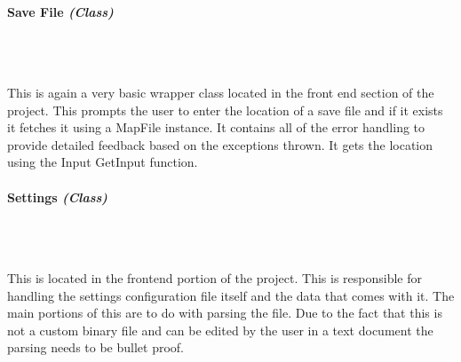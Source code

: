 \begin{FlushLeft}
    
    \pagebreak
\paragraph{Save File \textit{(Class)}} \mbox{} \\

    \begin{figure}[H]
        \centering
    \end{figure}\\

    This is again a very basic wrapper class located in the front end section of the project. This prompts the user to enter the location of a save file and if it exists it fetches it using a MapFile instance. It contains all of the error handling to provide detailed feedback based on the exceptions thrown. It gets the location using the Input GetInput function.\\

    \bk

    
    \pagebreak
\paragraph{Settings \textit{(Class)}} \mbox{} \\

    \begin{figure}[H]
        \centering
    \end{figure}\\
    This is located in the frontend portion of the project. This is responsible for handling the settings configuration file itself and the data that comes with it. The main portions of this are to do with parsing the file. Due to the fact that this is not a custom binary file and can be edited by the user in a text document the parsing needs to be bullet proof. \\ \bk


\end{FlushLeft}

